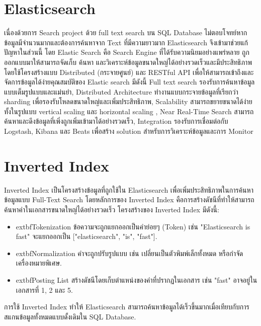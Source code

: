 \section{Elasticsearch}
\hspace{1.27cm}เนื่องด้วยการ Search project ด้วย full text search บน SQL Database ไม่ตอบโจทย์หากข้อมูลมีจำนวนมากและต้องการค้นหาจาก Text ที่มีความยาวมาก
Elasticsearch จึงเข้ามาช่วยแก้ปัญหาในส่วนนี้ โดย Elastic Search คือ Search Engine ที่ได้รับความนิยมอย่างแพร่หลาย ถูกออกแบบมาให้สามารถจัดเก็บ ค้นหา และวิเคราะห์ข้อมูลขนาดใหญ่ได้อย่างรวดเร็วและมีประสิทธิภาพ 
โดยใช้โครงสร้างแบบ Distributed (กระจายศูนย์) และ RESTful API เพื่อให้สามารถเข้าถึงและจัดการข้อมูลได้ง่ายคุณสมบัติของ Elastic search มีดังนี้ Full text search  รองรับการค้นหาข้อมูลแบบเต็มรูปแบบและแม่นยำ, Distributed Architecture  ทำงานแบบกระจายข้อมูลที่เรียกว่า sharding เพื่อรองรับโหลดขนาดใหญ่และเพิ่มประสิทธิภาพ, Scalability สามารถขยายขนาดได้ง่ายทั้งในรูปแบบ vertical scaling และ horizontal scaling , Near Real-Time Search  สามารถค้นหาและดึงข้อมูลที่เพิ่งถูกเพิ่มเข้ามาได้อย่างรวดเร็ว, Integration รองรับการเชื่อมต่อกับ Logstash, Kibana และ Beats เพื่อสร้าง solution สำหรับการวิเคราะห์ข้อมูลและการ Monitor

\section{Inverted Index}
\hspace{1.27cm}Inverted Index เป็นโครงสร้างข้อมูลที่ถูกใช้ใน Elasticsearch เพื่อเพิ่มประสิทธิภาพในการค้นหาข้อมูลแบบ Full-Text Search โดยหลักการของ Inverted Index คือการสร้างดัชนีที่ทำให้สามารถค้นหาคำในเอกสารขนาดใหญ่ได้อย่างรวดเร็ว โครงสร้างของ Inverted Index มีดังนี้:

\begin{itemize}
\item 	extbf{Tokenization} ข้อความจะถูกแยกออกเป็นคำย่อยๆ (Token) เช่น "Elasticsearch is fast" จะแยกออกเป็น ["elasticsearch", "is", "fast"].
\item 	extbf{Normalization} คำจะถูกปรับรูปแบบ เช่น เปลี่ยนเป็นตัวพิมพ์เล็กทั้งหมด หรือกำจัดเครื่องหมายพิเศษ.
\item 	extbf{Posting List} สร้างดัชนีโดยเก็บตำแหน่งของคำที่ปรากฏในเอกสาร เช่น "fast" อาจอยู่ในเอกสารที่ 1, 2 และ 5.
\end{itemize}

การใช้ Inverted Index ทำให้ Elasticsearch สามารถค้นหาข้อมูลได้เร็วขึ้นมากเมื่อเทียบกับการสแกนข้อมูลทั้งหมดแบบดั้งเดิมใน SQL Database.

